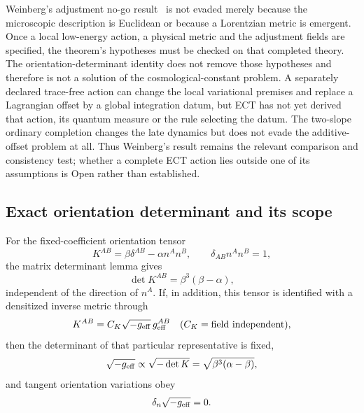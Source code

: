 Weinberg's adjustment no-go result~\cite{Weinberg1989} is not evaded merely
because the microscopic description is Euclidean or because a Lorentzian
metric is emergent.  Once a local low-energy action, a physical metric and
the adjustment fields are specified, the theorem's hypotheses must be
checked on that completed theory.  The orientation-determinant identity does
not remove those hypotheses and therefore is not a solution of the
cosmological-constant problem.  A separately declared trace-free action can
change the local variational premises and replace a Lagrangian offset by a
global integration datum, but ECT has not yet derived that action, its
quantum measure or the rule selecting the datum.  The two-slope ordinary
completion changes the late dynamics but does not evade the additive-offset
problem at all.  Thus Weinberg's result remains the relevant comparison and
consistency test; whether a complete ECT action lies outside one of its
assumptions is Open rather than established.

\subsection{Exact orientation determinant and its scope}
\label{subsec:main_theorem}

For the fixed-coefficient orientation tensor
\begin{equation}
 K^{AB}=\beta\delta^{AB}-\alpha n^An^B,
 \qquad \delta_{AB}n^An^B=1,
 \label{eq:KAB_cc}
\end{equation}
the matrix determinant lemma gives
\begin{equation}
 \det K^{AB}=\beta^3(\beta-\alpha),
 \label{eq:detK}
\end{equation}
independent of the direction of $n^A$.  If, in addition, this tensor is
identified with a densitized inverse metric through
\begin{equation}
 K^{AB}=C_K\sqrt{-g_{\rm eff}}\,g_{\rm eff}^{AB}
 \quad (C_K=\text{field independent}),
 \label{eq:K_geff_identification}
\end{equation}
then the determinant of that particular representative is fixed,
\begin{equation}
 \sqrt{-g_{\rm eff}}\propto\sqrt{-\det K}
 =\sqrt{\beta^3(\alpha-\beta)},
 \label{eq:sqrt_g_const}
\end{equation}
and tangent orientation variations obey
\begin{equation}
 \delta_n\sqrt{-g_{\rm eff}}=0.
 \label{eq:delta_sqrt_g}
\end{equation}


